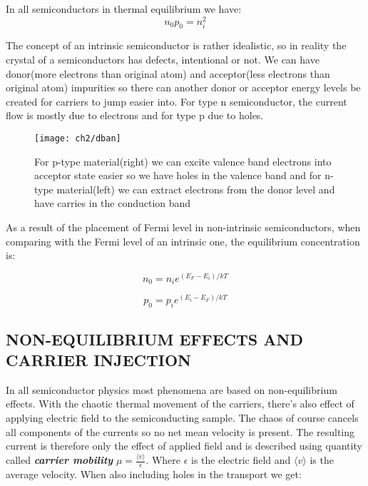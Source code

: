 In all semiconductors in thermal equilibrium we have:
\begin{equation}
n_0p_0 = n_i^2
\end{equation}

The concept of an intrinsic semiconductor is rather idealistic, so in reality the crystal of a semiconductors has defects, intentional or not. We can have donor(more electrons than original atom) and acceptor(less electrons than original atom) impurities so there can another donor or acceptor energy levels be created for carriers to jump easier into. For type n semiconductor, the current flow is mostly due to electrons and for type p due to holes.

\begin{figure}
\centering
\texttt{[image: ch2/dban]}
\caption{For p-type material(right) we can excite valence band electrons into acceptor state easier so we have holes in the valence band and for n-type material(left) we can extract electrons from the donor level and have carries in the conduction band\cite{hyper}}
\end{figure}

As a result of the placement of Fermi level in non-intrinsic semiconductors, when comparing with the Fermi level of an intrinsic one, the equilibrium concentration is:

\begin{equation}
n_0=n_ie^{(E_F-E_i)/kT}
\end{equation}

\begin{equation}
p_0=p_ie^{(E_i-E_F)/kT}
\end{equation}

\subsection{NON-EQUILIBRIUM EFFECTS AND CARRIER INJECTION}

In all semiconductor physics most phenomena are based on non-equilibrium effects. With the chaotic thermal movement of the carriers, there's also effect of applying electric field to the semiconducting sample. The chaos of course cancels all components of the currents so no net mean velocity is present. The resulting current is therefore only the effect of applied field and is described using quantity called \textit{\textbf{carrier mobility}} $\mu =\frac{\langle v \rangle }{\epsilon }$. Where $\epsilon$ is the electric field and $\langle v\rangle $ is the average velocity. When also including holes in the transport we get:

